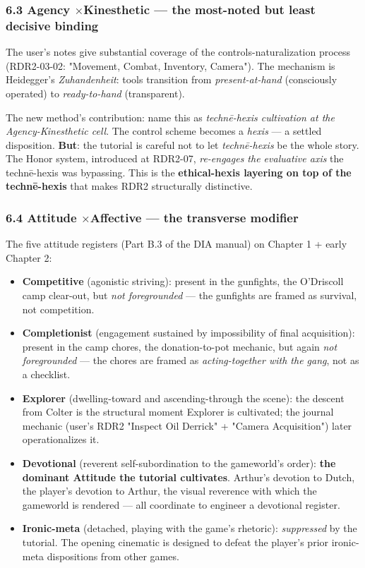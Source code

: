 \documentclass[11pt]{report}
\begin{document}
\subsubsection{6.3 Agency $\times$\allowbreak  Kinesthetic — the most-noted but least decisive binding}


The user's notes give substantial coverage of the controls-naturalization process (RDR2-03-02: "Movement, Combat, Inventory, Camera"). The mechanism is Heidegger's \textit{Zuhandenheit}: tools transition from \textit{present-at-hand} (consciously operated) to \textit{ready-to-hand} (transparent).


The new method's contribution: name this as \textit{technē-hexis cultivation at the Agency-Kinesthetic cell}. The control scheme becomes a \textit{hexis} — a settled disposition. \textbf{But}: the tutorial is careful not to let \textit{technē-hexis} be the whole story. The Honor system, introduced at RDR2-07, \textit{re-engages the evaluative axis} the technē-hexis was bypassing. This is the \textbf{ethical-hexis layering on top of the technē-hexis} that makes RDR2 structurally distinctive.


\subsubsection{6.4 Attitude $\times$\allowbreak  Affective — the transverse modifier}


The five attitude registers (Part B.3 of the DIA manual) on Chapter 1 + early Chapter 2:


\begin{itemize}
\item \textbf{Competitive} (agonistic striving): present in the gunfights, the O'Driscoll camp clear-out, but \textit{not foregrounded} — the gunfights are framed as survival, not competition. 
\item \textbf{Completionist} (engagement sustained by impossibility of final acquisition): present in the camp chores, the donation-to-pot mechanic, but again \textit{not foregrounded} — the chores are framed as \textit{acting-together with the gang}, not as a checklist.
\item \textbf{Explorer} (dwelling-toward and ascending-through the scene): the descent from Colter is the structural moment Explorer is cultivated; the journal mechanic (user's RDR2 "Inspect Oil Derrick" + "Camera Acquisition") later operationalizes it.
\item \textbf{Devotional} (reverent self-subordination to the gameworld's order): \textbf{the dominant Attitude the tutorial cultivates}. Arthur's devotion to Dutch, the player's devotion to Arthur, the visual reverence with which the gameworld is rendered — all coordinate to engineer a devotional register.
\item \textbf{Ironic-meta} (detached, playing with the game's rhetoric): \textit{suppressed} by the tutorial. The opening cinematic is designed to defeat the player's prior ironic-meta dispositions from other games.
\end{itemize}
\end{document}
